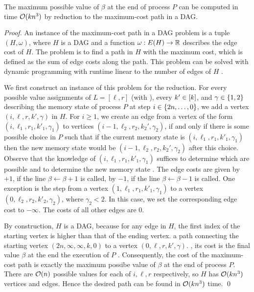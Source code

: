 \begin{lemma}
\label{lem:ham_path}
The maximum possible value of $\beta$ at the end of process $P$ can be computed in time $\mathcal{O}(kn^3)$ by reduction to the maximum-cost path in a DAG.
\end{lemma}
\begin{proof}
An instance of the maximum-cost path in a DAG problem is a tuple $(H, \omega)$, where $H$ is a DAG and a function $\omega: E(H) \to \mathbb{R}$ describes the edge cost of $H$.
The problem is to find a path in $H$ with the maximum cost, which is defined as the sum of edge costs along the path.
This problem can be solved with dynamic programming with runtime linear to the number of edges  of $H$ .

We first construct an instance of this problem for the reduction. 
For every possible value assignments of $L = [\ell, r]$ (with ), every $k' \in [k]$, and $\gamma \in \{ 1,2 \}$ describing the memory state of process $P$ at step $i \in \{ 2n, \ldots, 0 \}$, we add a vertex $(i,\ell,r,k',\gamma)$ in $H$. 
For $i \geq 1$, we create an edge from a vertex of the form $(i,\ell_1,r_1,k'_1,\gamma_1)$ to vertices $(i-1,\ell_2,r_2,k_2',\gamma_2)$, if and only if there is some possible choice in $P$ such that if the current memory state is $(i,\ell_1,r_1,k'_1,\gamma_1)$ then the new memory state would be $(i-1, \ell_2, r_2, k_2',\gamma_2)$ after this choice. 
Observe that the knowledge of $(i, \ell_1, r_1, k'_1,\gamma_1)$ suffices to determine which  are possible and to determine the new memory state . 
The edge costs are given by $+1$, if the line $\beta \leftarrow \beta + 1$ is called, by $-1$, if the line $\beta \leftarrow \beta- 1$ is called.
One exception is the step from a vertex $(1,\ell_1,r_1,k'_1,\gamma_1)$ to a vertex $(0,\ell_2,r_2,k'_2,\gamma_2)$, where $\gamma_2 < 2$.
In this case, we set the corresponding edge cost to $-\infty$.
The costs of all other edges are 0.

By construction, $H$ is a DAG, because for any edge in $H$, the first index of the starting vertex is higher than that of the ending vertex.
 a path connecting the starting vertex $(2n, \infty, \infty, k, 0)$ to a vertex $(0, \ell, r, k', \gamma)$. , its cost is the final value  $\beta$ at the end  the execution of $P$ .
Consequently, the cost of the maximum-cost path is exactly the maximum possibe value of $\beta$ at the end of process $P$. 
There are $\mathcal{O}(n)$ possible values for each of $i, \ell, r$ respectively, so $H$ has $\mathcal{O}(kn^3)$ vertices and edges. Hence the desired path can be found in $\mathcal{O}(kn^3)$ time.
\qed
\end{proof}

